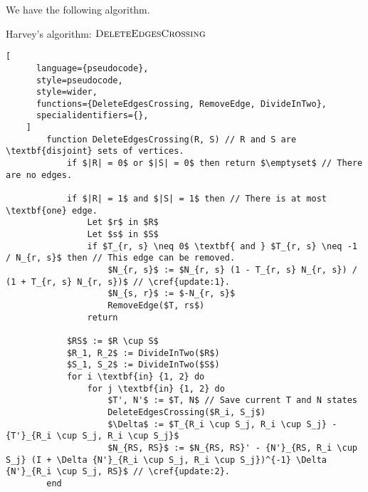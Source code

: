 We have the following algorithm.

\begin{programruledcaption}{Harvey's algorithm: \(\textsc{DeleteEdgesCrossing}\)}
    \begin{lstlisting}[
      language={pseudocode},
      style=pseudocode,
      style=wider,
      functions={DeleteEdgesCrossing, RemoveEdge, DivideInTwo},
      specialidentifiers={},
    ]
        function DeleteEdgesCrossing(R, S) // R and S are \textbf{disjoint} sets of vertices.
            if $|R| = 0$ or $|S| = 0$ then return $\emptyset$ // There are no edges.

            if $|R| = 1$ and $|S| = 1$ then // There is at most \textbf{one} edge.
                Let $r$ in $R$
                Let $s$ in $S$
                if $T_{r, s} \neq 0$ \textbf{ and } $T_{r, s} \neq -1 / N_{r, s}$ then // This edge can be removed.
                    $N_{r, s}$ := $N_{r, s} (1 - T_{r, s} N_{r, s}) / (1 + T_{r, s} N_{r, s})$ // \cref{update:1}.
                    $N_{s, r}$ := $-N_{r, s}$
                    RemoveEdge($T, rs$)
                return

            $RS$ := $R \cup S$
            $R_1, R_2$ := DivideInTwo($R$)
            $S_1, S_2$ := DivideInTwo($S$)
            for i \textbf{in} {1, 2} do
                for j \textbf{in} {1, 2} do
                    $T', N'$ := $T, N$ // Save current T and N states
                    DeleteEdgesCrossing($R_i, S_j$)
                    $\Delta$ := $T_{R_i \cup S_j, R_i \cup S_j} - {T'}_{R_i \cup S_j, R_i \cup S_j}$
                    $N_{RS, RS}$ := $N_{RS, RS}' - {N'}_{RS, R_i \cup S_j} (I + \Delta {N'}_{R_i \cup S_j, R_i \cup S_j})^{-1} \Delta {N'}_{R_i \cup S_j, RS}$ // \cref{update:2}.
        end
    \end{lstlisting}
\end{programruledcaption}


